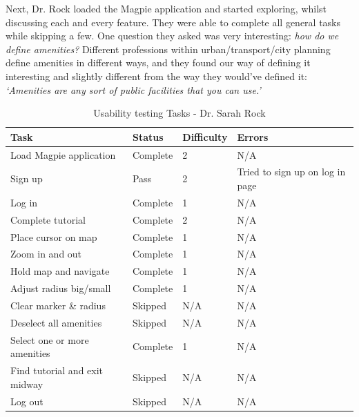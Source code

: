 \noindent Next, Dr. Rock loaded the Magpie application and started exploring,
whilst discussing each and every feature. They were able to complete all general
tasks while skipping a few. One question they asked was very interesting:
\emph{how do we define amenities?} Different professions within
urban/transport/city planning define amenities in different ways, and they found
our way of defining it interesting and slightly different from the way they
would've defined it: \emph{`Amenities are any sort of public facilities that you
    can use.'}
\begin{table}[h!]
    \centering
    \caption{Usability testing Tasks - Dr. Sarah Rock}
    \begin{tabular}{|p{}|p{}|p{}|p{}|}
        \hline
        \textbf{Task}                 & \textbf{Status} & \textbf{Difficulty} & \textbf{Errors}                 \\
        \hline
        Load Magpie application       & Complete        & 2                   & N/A                             \\
        \hline
        Sign up                       & Pass            & 2                   & Tried to sign up on log in page \\
        \hline
        Log in                        & Complete        & 1                   & N/A                             \\
        \hline
        Complete tutorial             & Complete        & 2                   & N/A                             \\
        \hline
        Place cursor on map           & Complete        & 1                   & N/A                             \\
        \hline
        Zoom in and out               & Complete        & 1                   & N/A                             \\
        \hline
        Hold map and navigate         & Complete        & 1                   & N/A                             \\
        \hline
        Adjust radius big/small       & Complete        & 1                   & N/A                             \\
        \hline
        Clear marker \& radius        & Skipped         & N/A                 & N/A                             \\
        \hline
        Deselect all amenities        & Skipped         & N/A                 & N/A                             \\
        \hline
        Select one or more amenities  & Complete        & 1                   & N/A                             \\
        \hline
        Find tutorial and exit midway & Skipped         & N/A                 & N/A                             \\
        \hline
        Log out                       & Skipped         & N/A                 & N/A                             \\
        \hline
    \end{tabular}
\end{table}

